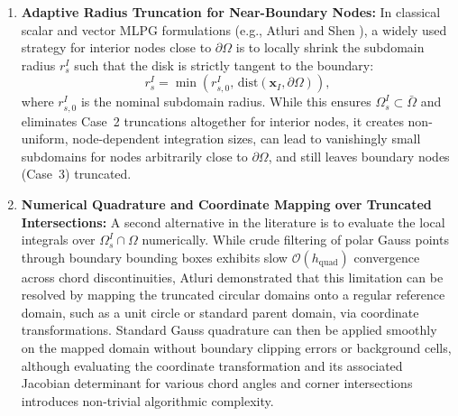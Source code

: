 \documentclass[VANCOUVER,Times1COL]{WileyNJD-v5}
\begin{document}
\begin{enumerate}
    \item \textbf{Adaptive Radius Truncation for Near-Boundary Nodes:}
          In classical scalar and vector MLPG formulations (e.g., Atluri and Shen \cite{atluri2002meshless}), a widely used strategy for interior nodes close to $\partial\Omega$ is to locally shrink the subdomain radius $r_s^I$ such that the disk is strictly tangent to the boundary:
          \begin{equation}
              r_s^I = \min\left(r_{s, 0}^I, \, \mathrm{dist}(\mathbf{x}_I, \partial\Omega)\right),
              \label{eq:radius_shrink_tangent}
          \end{equation}
          where $r_{s, 0}^I$ is the nominal subdomain radius. While this ensures $\Omega_s^I \subset \bar{\Omega}$ and eliminates Case~2 truncations altogether for interior nodes, it creates non-uniform, node-dependent integration sizes, can lead to vanishingly small subdomains for nodes arbitrarily close to $\partial\Omega$, and still leaves boundary nodes (Case~3) truncated.

    \item \textbf{Numerical Quadrature and Coordinate Mapping over Truncated Intersections:}
          A second alternative in the literature is to evaluate the local integrals over $\Omega_s^I \cap \Omega$ numerically. While crude filtering of polar Gauss points through boundary bounding boxes exhibits slow $\mathcal{O}(h_{\mathrm{quad}})$ convergence across chord discontinuities, Atluri \cite{atluri2004meshless} demonstrated that this limitation can be resolved by mapping the truncated circular domains onto a regular reference domain, such as a unit circle or standard parent domain, via coordinate transformations. Standard Gauss quadrature can then be applied smoothly on the mapped domain without boundary clipping errors or background cells, although evaluating the coordinate transformation and its associated Jacobian determinant for various chord angles and corner intersections introduces non-trivial algorithmic complexity.


\end{enumerate}
\end{document}
